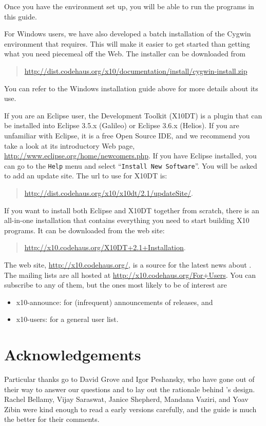 Once you have the environment set up, you will be able to run the programs in
this guide.

For Windows users, we have also developed a batch installation of the Cygwin
environment that \Xten requires.  This will make it easier to get started than
getting what you need piecemeal off the Web. The installer can be downloaded
from
\begin{quote}
\href{http://dist.codehaus.org/x10/documentation/install/cygwin-install.zip}
{http://dist.codehaus.org/x10/documentation/install/cygwin-install.zip}
\end{quote}
You can refer to the Windows installation guide above for more details about its
use.

If you are an Eclipse user, the \Xten{} Development Toolkit (X10DT) is a
plugin that can be installed
into Eclipse 3.5.x (Galileo) or Eclipse 3.6.x (Helios).  If you are unfamiliar
with Eclipse, it is a free Open Source IDE, and we recommend you take a look at
its introductory Web page, \href{http://www.eclipse.org/home/newcomers.php}
{http://www.eclipse.org/home/newcomers.php}.  
If you have Eclipse installed, you can go to the 
{\tt Help} menu and select ``{\tt Install New Software}''.  You will be asked
to add an update site.  The url to use for X10DT is:
\begin{quote}
\href{http://dist.codehaus.org/x10/x10dt/2.1/updateSite/}
{http://dist.codehaus.org/x10/x10dt/2.1/updateSite/}.
\end{quote}
If you want to install both Eclipse and X10DT together from scratch, there is
an all-in-one installation that contains everything you need to start
building X10 programs.  It can be downloaded from the \Xten{} web site:
\begin{quote}
\href{http://x10.codehaus.org/X10DT+2.1+Installation}
{http://x10.codehaus.org/X10DT+2.1+Installation}.
\end{quote}

The \Xten{} web site, \href{http://x10.codehaus.org/}
{http://x10.codehaus.org/}, is a source for the latest news about
\Xten{}. 
The \Xten{} mailing lists are all hosted at \href{http://x10.codehaus.org/For+Users}
{http://x10.codehaus.org/For+Users}. 
You can subscribe to any of them, but the ones most likely 
to be of interest are
\begin{itemize}
\item x10-announce: for (infrequent) announcements of \Xten{} releases, and
\item x10-users: for a general \Xten{} user list.
\end{itemize}
\section*{Acknowledgements}
Particular thanks go to David Grove and Igor Peshansky, who have gone out of their
way to answer our questions and to lay out the rationale behind \Xten's design.  Rachel
Bellamy, Vijay Saraswat, Janice Shepherd, Mandana Vaziri, and Yoav Zibin were
kind enough to read a early versions carefully, and the guide is much the
better for their comments.
